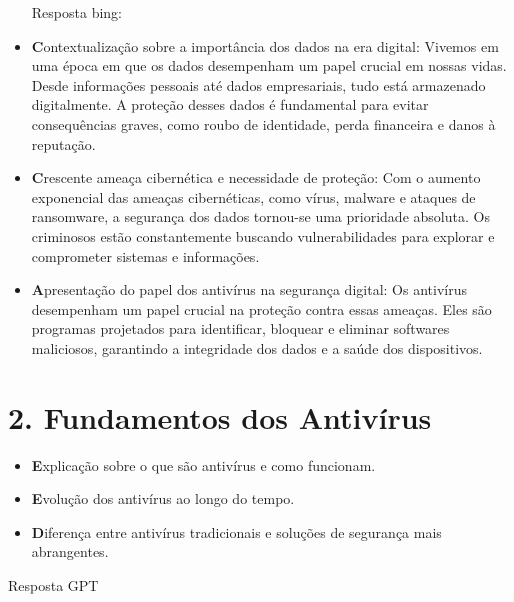 \documentclass[10pt,conference,twocolumn]{article}
\begin{document}
\begin{itemize}
Resposta bing:

\item \textbf Contextualização sobre a importância dos dados na era digital: Vivemos em uma época em que os dados desempenham um papel crucial em nossas vidas. Desde informações pessoais até dados empresariais, tudo está armazenado digitalmente. A proteção desses dados é fundamental para evitar consequências graves, como roubo de identidade, perda financeira e danos à reputação.
\item \textbf Crescente ameaça cibernética e necessidade de proteção: Com o aumento exponencial das ameaças cibernéticas, como vírus, malware e ataques de ransomware, a segurança dos dados tornou-se uma prioridade absoluta. Os criminosos estão constantemente buscando vulnerabilidades para explorar e comprometer sistemas e informações.
\item \textbf Apresentação do papel dos antivírus na segurança digital: Os antivírus desempenham um papel crucial na proteção contra essas ameaças. Eles são programas projetados para identificar, bloquear e eliminar softwares maliciosos, garantindo a integridade dos dados e a saúde dos dispositivos.

\end{itemize}

\section* {2. Fundamentos dos Antivírus}
\begin{itemize}
\item \textbf Explicação sobre o que são antivírus e como funcionam.
\item \textbf Evolução dos antivírus ao longo do tempo.
\item \textbf Diferença entre antivírus tradicionais e soluções de segurança mais abrangentes.
\end{itemize}

Resposta GPT
\end{document}
